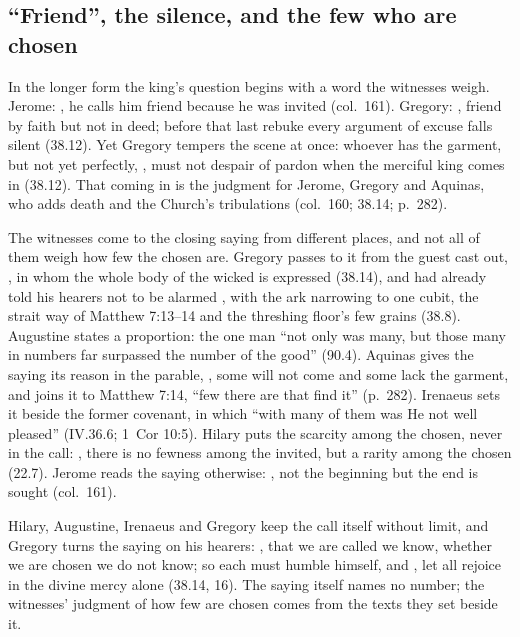 \subsection{``Friend'', the silence, and the few who are chosen}

In the longer form the king's question begins with a word the witnesses
weigh. Jerome: , he calls him
friend because he was invited (col.~161). Gregory: , friend by faith but not in deed; before that last
rebuke every argument of excuse falls silent (38.12). Yet Gregory tempers the
scene at once: whoever has the garment, but not yet perfectly, , must not despair of pardon when
the merciful king comes in (38.12). That coming in is the judgment for Jerome,
Gregory and Aquinas, who adds death and the Church's tribulations (col.~160;
38.14; p.~282).

The witnesses come to the closing saying from different places, and not all
of them weigh how few the chosen are. Gregory passes to it from the guest cast
out, , in whom the whole
body of the wicked is expressed (38.14), and had already told his hearers not
to be alarmed , with
the ark narrowing to one cubit, the strait way of Matthew 7:13--14 and the
threshing floor's few grains (38.8). Augustine states a proportion: the one
man ``not only was many, but those many in numbers far surpassed the number of
the good'' (90.4). Aquinas gives the saying its reason in the parable,
, some will
not come and some lack the garment, and joins it to Matthew 7:14, ``few there
are that find it'' (p.~282). Irenaeus sets it beside the former covenant, in
which ``with many of them was He not well pleased'' (IV.36.6; 1~Cor 10:5).
Hilary puts the scarcity among the chosen, never in the call: , there is no fewness
among the invited, but a rarity among the chosen (22.7). Jerome reads the
saying otherwise: , not the beginning
but the end is sought (col.~161).

Hilary, Augustine, Irenaeus and Gregory keep the call itself without limit,
and Gregory turns the saying on his hearers: , that
we are called we know, whether we are chosen we do not know; so each must
humble himself, and , let all
rejoice in the divine mercy alone (38.14, 16). The saying itself names no
number; the witnesses' judgment of how few are chosen comes from the texts
they set beside it.

